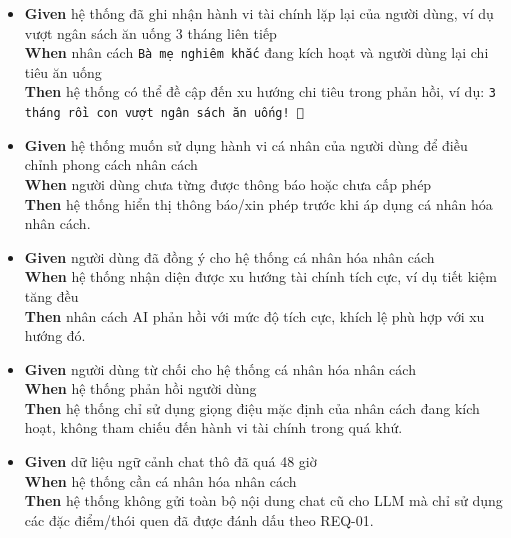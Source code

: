 \begin{itemize}
\item \textbf{Given} hệ thống đã ghi nhận hành vi tài chính lặp lại của người dùng, ví dụ vượt ngân sách ăn uống 3 tháng liên tiếp  \\ \hspace*{1.5em}  \textbf{When} nhân cách \texttt{Bà mẹ nghiêm khắc} đang kích hoạt và người dùng lại chi tiêu ăn uống  \\ \hspace*{1.5em}  \textbf{Then} hệ thống có thể đề cập đến xu hướng chi tiêu trong phản hồi, ví dụ: \texttt{3 tháng rồi con vượt ngân sách ăn uống! 😤}
\item \textbf{Given} hệ thống muốn sử dụng hành vi cá nhân của người dùng để điều chỉnh phong cách nhân cách  \\ \hspace*{1.5em}  \textbf{When} người dùng chưa từng được thông báo hoặc chưa cấp phép  \\ \hspace*{1.5em}  \textbf{Then} hệ thống hiển thị thông báo/xin phép trước khi áp dụng cá nhân hóa nhân cách.
\item \textbf{Given} người dùng đã đồng ý cho hệ thống cá nhân hóa nhân cách  \\ \hspace*{1.5em}  \textbf{When} hệ thống nhận diện được xu hướng tài chính tích cực, ví dụ tiết kiệm tăng đều  \\ \hspace*{1.5em}  \textbf{Then} nhân cách AI phản hồi với mức độ tích cực, khích lệ phù hợp với xu hướng đó.
\item \textbf{Given} người dùng từ chối cho hệ thống cá nhân hóa nhân cách  \\ \hspace*{1.5em}  \textbf{When} hệ thống phản hồi người dùng  \\ \hspace*{1.5em}  \textbf{Then} hệ thống chỉ sử dụng giọng điệu mặc định của nhân cách đang kích hoạt, không tham chiếu đến hành vi tài chính trong quá khứ.
\item \textbf{Given} dữ liệu ngữ cảnh chat thô đã quá 48 giờ  \\ \hspace*{1.5em}  \textbf{When} hệ thống cần cá nhân hóa nhân cách  \\ \hspace*{1.5em}  \textbf{Then} hệ thống không gửi toàn bộ nội dung chat cũ cho LLM mà chỉ sử dụng các đặc điểm/thói quen đã được đánh dấu theo REQ-01.
\end{itemize}
